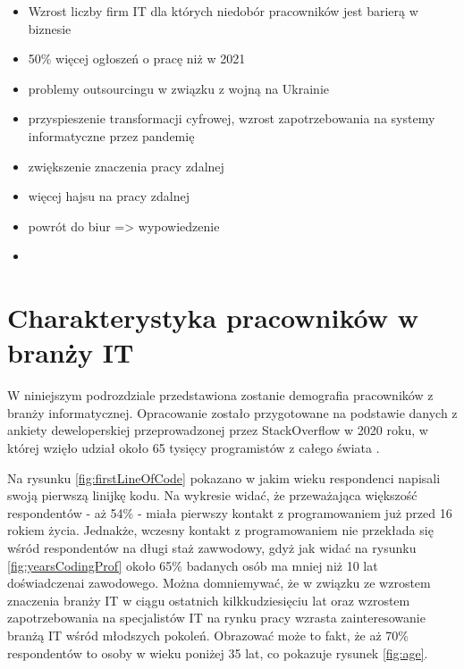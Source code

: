 \begin{itemize}
    \item Wzrost liczby firm IT dla których niedobór pracowników jest barierą w biznesie \cite{https://www.rp.pl/rynek-pracy/art35856021-wojna-nasili-niedobor-kadr-w-it-naplyw-nowych-zlecen-do-polski}
    \item 50\% więcej ogłoszeń o pracę niż w 2021\cite{https://www.rp.pl/rynek-pracy/art35856021-wojna-nasili-niedobor-kadr-w-it-naplyw-nowych-zlecen-do-polski}
    \item problemy outsourcingu w związku z wojną na Ukrainie \cite{https://www.computerworld.pl/news/Wojna-w-Ukrainie-stawia-globalny-outsourcing-IT-w-trudnej-sytuacji,437151.html}
    \item przyspieszenie transformacji cyfrowej,  wzrost zapotrzebowania na systemy informatyczne przez pandemię \cite{https://itwiz.pl/sytuacja-na-rynku-pracy-it-w-dobie-koronawirusa/}
    \item zwiększenie znaczenia pracy zdalnej \cite{https://antyweb.pl/praca-zdalna-w-it}
    \item więcej hajsu na pracy zdalnej \cite{https://cyberdefence24.pl/biznes-i-finanse/polscy-pracodawcy-nie-chca-pracy-zdalnej-branza-it-zachowuje-elastycznosc}
    \item powrót do biur => wypowiedzenie \cite{https://geek.justjoin.it/przymusowy-powrot-do-biura-z-home-office-w-branzy-it-64-proc-wrociloby-z-wypowiedzeniem}
    \item
\end{itemize}


\section{Charakterystyka pracowników w branży IT}

W niniejszym podrozdziale przedstawiona zostanie demografia pracowników z branży informatycznej.
Opracowanie zostało przygotowane na podstawie danych z ankiety deweloperskiej przeprowadzonej przez StackOverflow w 2020 roku, w której wzięło udział około 65 tysięcy programistów z całego świata \cite{so-survey-2020}.

Na rysunku \ref{fig:firstLineOfCode} pokazano w jakim wieku respondenci napisali swoją pierwszą linijkę kodu.
Na wykresie widać, że przeważająca większość respondentów - aż 54\% - miała pierwszy kontakt z programowaniem już przed 16 rokiem życia.
Jednakże, wczesny kontakt z programowaniem nie przekłada się wśród respondentów na długi staż zawwodowy, gdyż jak widać na rysunku \ref{fig:yearsCodingProf} około 65\% badanych osób ma mniej niż 10 lat doświadczenai zawodowego.
Można domniemywać, że w związku ze wzrostem znaczenia branży IT w ciągu ostatnich kilkkudziesięciu lat oraz wzrostem zapotrzebowania na specjalistów IT na rynku pracy wzrasta zainteresowanie branżą IT wśród młodszych pokoleń.
Obrazować może to fakt, że aż 70\% respondentów to osoby w wieku poniżej 35 lat, co pokazuje rysunek \ref{fig:age}.

